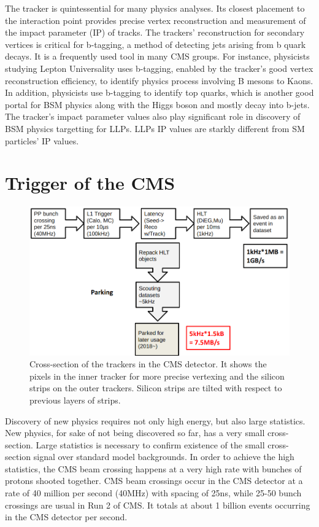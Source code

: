 The tracker is quintessential for many physics analyses.
Its closest placement to the interaction point provides precise vertex reconstruction and measurement of the impact parameter (IP) of tracks.
The trackers' reconstruction for secondary vertices is critical for b-tagging, a method of detecting jets arising from b quark decays.
It is a frequently used tool in many CMS groups.
For instance, physicists studying Lepton Universality uses b-tagging, enabled by the tracker's good vertex reconstruction efficiency, to identify physics process involving B mesons to Kaons.
In addition, physicists use b-tagging to identify top quarks, which is another good portal for BSM physics along with the Higgs boson and mostly decay into b-jets.
The tracker's impact parameter values also play significant role in discovery of BSM physics targetting for LLPs.
LLPs IP values are starkly different from SM particles' IP values.



\section{Trigger of the CMS}
\begin{figure}[h!]
	\caption{Cross-section of the trackers in the CMS detector. It shows the pixels in the inner tracker for more precise vertexing and the silicon strips on the outer trackers. Silicon strips are tilted with respect to previous layers of strips. \cite{trk}}
  \label{fig:trig}
  \centering
  \includegraphics[width=0.95\linewidth]{figs/Trig.png}
\end{figure}
Discovery of new physics requires not only high energy, but also large statistics.
New physics, for sake of not being discovered so far, has a very small cross-section.
Large statistics is necessary to confirm existence of the small cross-section signal over standard model backgrounds.
In order to achieve the high statistics, the CMS beam crossing happens at a very high rate with bunches of protons shooted together.
CMS beam crossings occur in the CMS detector at a rate of 40 million per second (40MHz) with spacing of 25ns, while 25-50 bunch crossings are usual in Run 2 of CMS.
It totals at about 1 billion events occurring in the CMS detector per second. 

